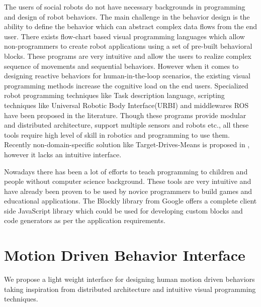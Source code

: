 \documentclass{llncs}
\begin{document}
	The users of social robots do not have necessary backgrounds in programming and design of robot behaviors. The main challenge in the behavior design is the ability to define the behavior which can abstract complex data flows from the end user. There exists flow-chart based visual programming languages\cite{Choregraphe} which allow non-programmers to create robot applications using a set of pre-built behavioral blocks. These programs are very intuitive and allow the users to realize complex sequence of movements and sequential behaviors. However when it comes to designing reactive behaviors for human-in-the-loop scenarios, the existing visual programming methods increase the cognitive load on the end users. Specialized robot programming techniques like Task description language\cite{Simmons724883}, scripting techniques like Universal Robotic Body Interface(URBI)\cite{Baillie4814281} and middlewares ROS\cite{quigley2009ros} have been proposed in the literature. Though these programs provide modular and distributed architecture, support multiple sensors and robots etc., all these tools require high level of skill in robotics and programming to use them. Recently non-domain-specific solution like Target-Drives-Means is proposed in \cite{BerenzTDM2014}, however it lacks an intuitive interface.
	
	Nowadays there has been a lot of efforts to teach programming to children and people without computer science background\cite{Scratch}\cite{Blockly}. These tools are very intuitive and have already been proven to be used by novice programmers to build games and educational applications. The Blockly library\cite{Blockly} from Google offers a complete client side JavaScript library which could be used for developing custom blocks and code generators as per the application requirements.
\section{Motion Driven Behavior Interface}
We propose a light weight interface for designing human motion driven behaviors taking inspiration from distributed architecture\cite{quigley2009ros} and intuitive visual programming techniques\cite{Blockly}. 
\end{document}
